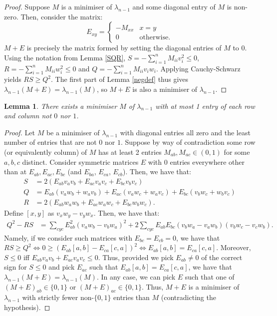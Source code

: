 \documentclass[12pt]{article}
\newtheorem{lmm}[thm]{Lemma}
\begin{document}
\begin{proof} Suppose $M$ is a minimiser of $\lambda_{n-1}$ and some diagonal entry of $M$ is non-zero. Then, consider the matrix:
\begin{equation*}
    E_{xy} = \begin{cases} -M_{xx} & x=y \\ 0 & \text{otherwise.}\end{cases}
\end{equation*}
$M+E$ is precisely the matrix formed by setting the diagonal entries of $M$ to 0. Using the notation from Lemma \ref{SQR}, $S= -\sum_{i=1}^{n} M_{ii}v_i^2\le 0$, $R= -\sum_{i=1}^{n} M_{ii}w_i^2\le 0$ and $Q = -\sum_{i=1}^{n} M_{ii}v_iw_i$. Applying Cauchy-Schwarz yields $RS \ge Q^2$. The first part of Lemma \ref{negdef} thus gives $\lambda_{n-1}(M+E) = \lambda_{n-1}(M)$, so $M+E$ is also a minimiser of $\lambda_{n-1}$. 
\end{proof}
\begin{lmm} There exists a minimiser $M$ of $\lambda_{n-1}$ with at most 1 entry of each row and column not $0$ nor $1$. 
\end{lmm}
\begin{proof} Let $M$ be a minimiser of $\lambda_{n-1}$ with diagonal entries all zero and the least number of entries that are not $0$ nor $1$. Suppose by way of contradiction some row (or equivalently column) of $M$ has at least 2 entries $M_{ab}, M_{ac} \in (0,1)$ for some $a,b,c$ distinct. Consider symmetric matrices $E$ with 0 entries everywhere other than at $E_{ab},E_{ac}, E_{bc}$ (and $E_{ba}$, $E_{ca}$, $E_{cb}$). Then, we have that:
\begin{align*}
    S & = 2(E_{ab}v_av_b+E_{ac}v_av_c+E_{bc}v_bv_c) \\ 
    Q & = E_{ab}(v_aw_b+w_av_b)+E_{ac}(v_aw_c+w_av_c)+E_{bc}(v_bw_c+w_bv_c)\\ 
    R & = 2(E_{ab}w_aw_b+E_{ac}w_aw_c+E_{bc}w_bw_c).
\end{align*}
Define $[x,y]$ as $v_xw_y-v_yw_x$. Then, we have that:
\begin{align*}
    Q^2 -RS & =  \sum_{cyc} E_{ab}^2(v_aw_b-v_bw_a)^2 + 2\sum_{cyc} E_{ab}E_{bc}(v_bw_a-v_aw_b)(v_bw_c-v_cw_b).
\end{align*}
Namely, if we consider such matrices with $E_{bc}=E_{cb} = 0$, we have that $RS\ge Q^2 \iff 0 \ge (E_{ab}[a,b] - E_{ca}[c,a])^2 \iff E_{ab}[a,b] = E_{ca}[c,a]$. Moreover, $S\le 0$ iff $E_{ab}v_av_b + E_{ac}v_av_c \le 0$. Thus, provided we pick $E_{ab}\ne 0$ of the correct sign for $S\le 0$ and pick $E_{ac}$ such that $E_{ab}[a,b] = E_{ca}[c,a]$, we have that $\lambda_{n-1}(M+E)= \lambda_{n-1}(M)$. In any case, we can pick $E$ such that one of $(M+E)_{ab} \in \{0,1\}$ or $(M+E)_{ac} \in \{0,1\}$. Thus, $M+E$ is a minimiser of $\lambda_{n-1}$ with strictly fewer non-$\{0,1\}$ entries than $M$ (contradicting the hypothesis).
\end{proof}
\end{document}
